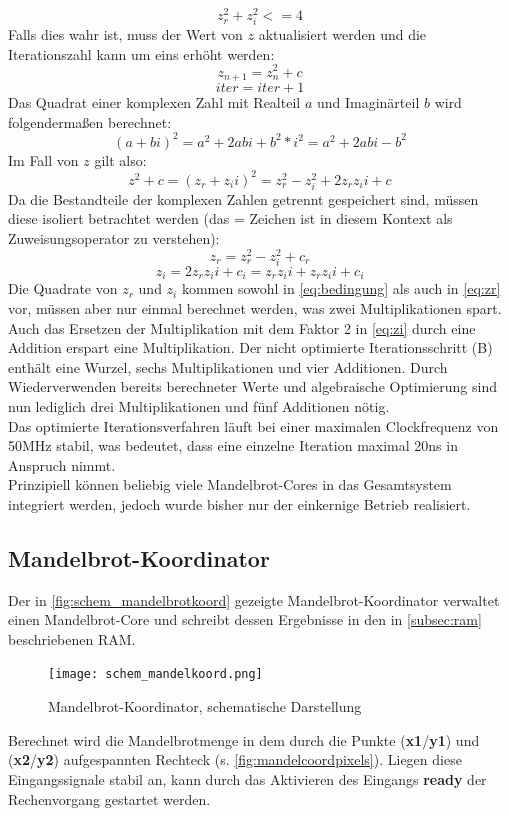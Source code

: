 \documentclass[a4paper,12pt,onesided]{report}
\begin{document}
\begin{equation}
	\label{eq:bedingung}
	z_r^2 + z_i^2 <= 4
\end{equation}
Falls dies wahr ist, muss der Wert von $z$ aktualisiert werden und die Iterationszahl kann um eins erhöht werden:
\[z_{n+1} = z_n^2 + c\]
\[iter = iter + 1\]
Das Quadrat einer komplexen Zahl mit Realteil $a$ und Imaginärteil $b$ wird folgendermaßen berechnet:
\[(a + bi)^2 = a^2 + 2abi + b^2*i^2 = a^2 + 2abi - b^2\]
Im Fall von $z$ gilt also:
\[z^2+c=(z_r + z_ii)^2 = z_r^2 - z_i^2 + 2z_rz_ii + c\]
Da die Bestandteile der komplexen Zahlen getrennt gespeichert sind, müssen diese isoliert betrachtet werden (das = Zeichen ist in diesem Kontext als Zuweisungsoperator zu verstehen):
\begin{equation}
	\label{eq:zr}
	z_r = z_r^2 - z_i^2 + c_r
\end{equation}
\begin{equation}
	\label{eq:zi}
	z_i = 2z_rz_ii + c_i = z_rz_ii + z_rz_ii + c_i
\end{equation}
Die Quadrate von $z_r$ und $z_i$ kommen sowohl in \autoref{eq:bedingung} als auch in \autoref{eq:zr} vor, müssen aber nur einmal berechnet werden, was zwei Multiplikationen spart.\\
Auch das Ersetzen der Multiplikation mit dem Faktor 2 in \autoref{eq:zi} durch eine Addition erspart eine Multiplikation.
Der nicht optimierte Iterationsschritt (B) enthält eine Wurzel, sechs Multiplikationen und vier Additionen.
Durch Wiederverwenden bereits berechneter Werte und algebraische Optimierung sind nun lediglich drei Multiplikationen und fünf Additionen nötig.\\
Das optimierte Iterationsverfahren läuft bei einer maximalen Clockfrequenz von 50MHz stabil, was bedeutet, dass eine einzelne Iteration maximal 20ns in Anspruch nimmt.\\
Prinzipiell können beliebig viele Mandelbrot-Cores in das Gesamtsystem integriert werden, jedoch wurde bisher nur der einkernige Betrieb realisiert.

\subsection{Mandelbrot-Koordinator}
Der in \autoref{fig:schem_mandelbrotkoord} gezeigte Mandelbrot-Koordinator verwaltet einen Mandelbrot-Core und schreibt dessen Ergebnisse in den in \autoref{subsec:ram} beschriebenen RAM.

\begin{figure}[H]
	\centering
	\texttt{[image: schem\_mandelkoord.png]}
	\caption{Mandelbrot-Koordinator, schematische Darstellung}
	\label{fig:schem_mandelbrotkoord}
\end{figure}
Berechnet wird die Mandelbrotmenge in dem durch die Punkte (\textbf{x1}/\textbf{y1}) und (\textbf{x2}/\textbf{y2}) aufgespannten Rechteck (s. \autoref{fig:mandelcoordpixels}).
Liegen diese Eingangssignale stabil an, kann durch das Aktivieren des Eingangs \textbf{ready} der Rechenvorgang gestartet werden.
\end{document}

